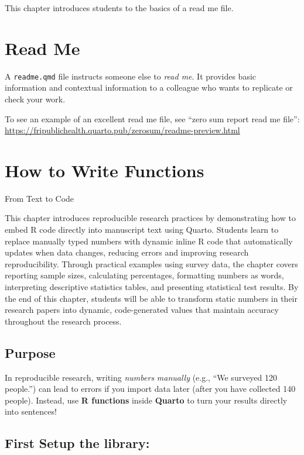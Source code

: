 \documentclass[
  english,
  letterpaper,
  DIV=11,
  numbers=noendperiod]{scrreprt}
\begin{document}
This chapter introduces students to the basics of a read me file.

\hfill\break

\chapter{Read Me}\label{read-me}

A \texttt{readme.qmd} file instructs someone else to \emph{read me}. It
provides basic information and contextual information to a colleague who
wants to replicate or check your work.

To see an example of an excellent read me file, see ``zero sum report
read me file'':
\url{https://fripublichealth.quarto.pub/zerosum/readme-preview.html}

\chapter{How to Write Functions}\label{how-to-write-functions}

From Text to Code

This chapter introduces reproducible research practices by demonstrating
how to embed R code directly into manuscript text using Quarto. Students
learn to replace manually typed numbers with dynamic inline R code that
automatically updates when data changes, reducing errors and improving
research reproducibility. Through practical examples using survey data,
the chapter covers reporting sample sizes, calculating percentages,
formatting numbers as words, interpreting descriptive statistics tables,
and presenting statistical test results. By the end of this chapter,
students will be able to transform static numbers in their research
papers into dynamic, code-generated values that maintain accuracy
throughout the research process.

\hfill\break

\section{Purpose}\label{purpose-1}

In reproducible research, writing \emph{numbers} \emph{manually} (e.g.,
``We surveyed 120 people.'') can lead to errors if you import data later
(after you have collected 140 people). Instead, use \textbf{R functions}
inside \textbf{Quarto} to turn your results directly into sentences!

\section{First Setup the library:}\label{first-setup-the-library-1}
\end{document}
